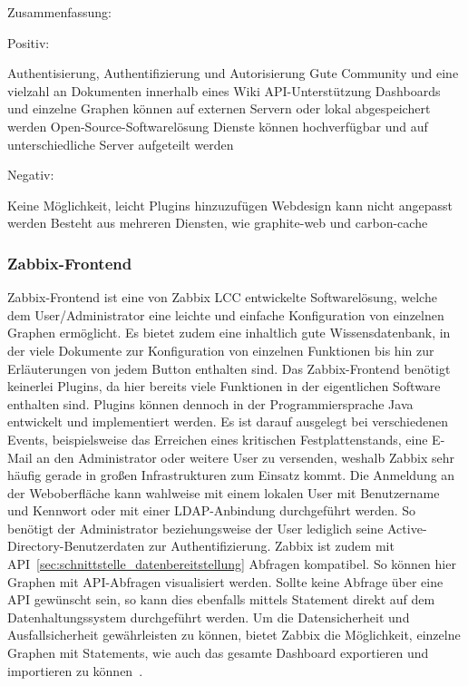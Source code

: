 Zusammenfassung:

Positiv:

\begin{outline}
  \1 Authentisierung, Authentifizierung und Autorisierung
  \1 Gute Community und eine vielzahl an Dokumenten innerhalb eines Wiki
  \1 API-Unterstützung
  \1 Dashboards und einzelne Graphen können auf externen Servern oder lokal
  abgespeichert werden
  \1 Open-Source-Softwarelösung
  \1 Dienste können hochverfügbar und auf unterschiedliche Server aufgeteilt
  werden
\end{outline}

Negativ:

\begin{outline}
  \1 Keine Möglichkeit, leicht Plugins hinzuzufügen
  \1 Webdesign kann nicht angepasst werden
  \1 Besteht aus mehreren Diensten, wie graphite-web und carbon-cache
\end{outline}


\subsubsection{Zabbix-Frontend}
\label{subsubsec:zabbix-frontend}
Zabbix-Frontend ist eine von Zabbix LCC entwickelte Softwarelösung, welche dem
User/Administrator eine leichte und einfache Konfiguration von einzelnen
Graphen ermöglicht. Es bietet zudem eine inhaltlich gute Wissensdatenbank, in
der viele Dokumente zur Konfiguration von einzelnen Funktionen bis hin zur
Erläuterungen von jedem Button enthalten sind. Das Zabbix-Frontend benötigt
keinerlei Plugins, da hier bereits viele Funktionen in der eigentlichen
Software enthalten sind. Plugins können dennoch in der Programmiersprache Java
entwickelt und implementiert werden. Es ist darauf ausgelegt bei verschiedenen
Events, beispielsweise das Erreichen eines kritischen Festplattenstands, eine
E-Mail an den Administrator oder weitere User zu versenden, weshalb Zabbix sehr
häufig gerade in großen Infrastrukturen zum Einsatz kommt. Die Anmeldung an der
Weboberfläche kann wahlweise mit einem lokalen User mit Benutzername und
Kennwort oder mit einer LDAP-Anbindung durchgeführt werden. So benötigt der
Administrator beziehungsweise der User lediglich seine
Active-Directory-Benutzerdaten zur Authentifizierung. Zabbix ist zudem mit
API~\ref{sec:schnittstelle_datenbereitstellung} Abfragen kompatibel. So können
hier Graphen mit API-Abfragen visualisiert werden. Sollte keine Abfrage über
eine API gewünscht sein, so kann dies ebenfalls mittels Statement direkt auf
dem Datenhaltungssystem durchgeführt werden. Um die Datensicherheit und
Ausfallsicherheit gewährleisten zu können, bietet Zabbix die Möglichkeit,
einzelne Graphen mit Statements, wie auch das gesamte Dashboard exportieren und
importieren zu können~\cite{zabbix-frontend}.


